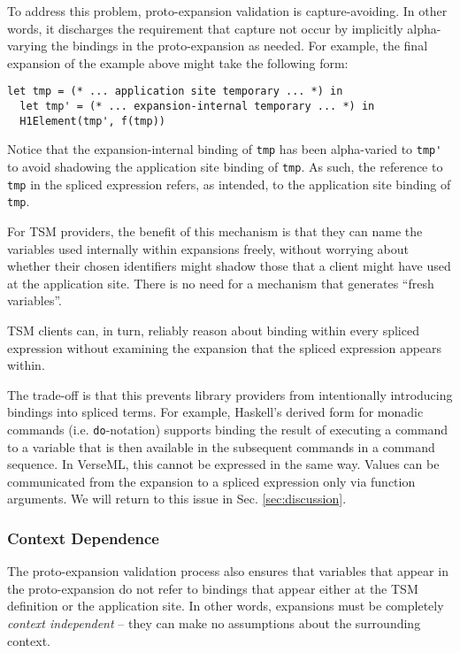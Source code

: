\documentclass[acmlarge,review,anonymous]{acmart}\settopmatter{printfolios=true}
\newcommand{\li}[1]{\lstinline{#1}}
\begin{document}
To address this problem, proto-expansion validation is capture-avoiding. In other words, it discharges the requirement that capture not occur by implicitly alpha-varying the bindings in the proto-expansion as needed. For example, the final expansion of the example above might take the following form:
\begin{lstlisting}[numbers=none]
  let tmp = (* ... application site temporary ... *) in 
  let tmp' = (* ... expansion-internal temporary ... *) in 
  H1Element(tmp', f(tmp))
\end{lstlisting}
Notice that the expansion-internal binding of \li{tmp} has been alpha-varied to \li{tmp'} to avoid shadowing the application site binding of \li{tmp}. As such, the reference to \li{tmp} in the spliced expression refers, as intended, to the application site binding of \li{tmp}.

For TSM providers, the benefit of this mechanism is that they can name the variables used internally within expansions freely, without worrying about whether their chosen identifiers might shadow those that a client might have used at the application site. There is no need for a mechanism that generates ``fresh variables''.

TSM clients can, in turn, reliably reason about binding within every spliced expression without examining the expansion that the spliced expression appears within.

The trade-off is that this prevents library providers from intentionally introducing bindings into spliced terms. For example, Haskell's derived form for monadic commands (i.e. \li{do}-notation) supports binding the result of executing a command to a variable that is then available in the subsequent commands in a command sequence. In VerseML, this cannot be expressed in the same way. Values can be communicated from the expansion to a spliced expression only via function arguments. 
We will return to this issue in Sec. \ref{sec:discussion}.


\subsubsection{Context Dependence}\label{sec:context-dependence}
The proto-expansion validation process also ensures that variables that appear in the proto-expansion do not refer to bindings that appear either at the TSM definition or the application site. In other words, expansions must be completely \emph{context independent} -- they can make no assumptions about the surrounding context.
\end{document}
